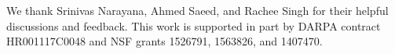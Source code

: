 \begin{acks}
We thank Srinivas Narayana, Ahmed Saeed, and Rachee Singh for their helpful discussions and feedback.
This work is supported in part by DARPA contract HR001117C0048 and NSF grants 1526791, 1563826, and 1407470.
\end{acks}